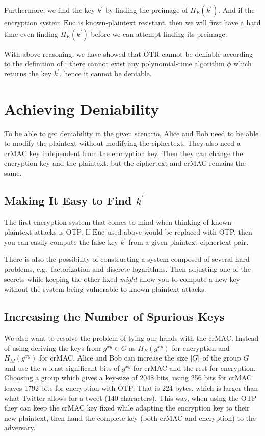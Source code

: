 Furthermore, we find the key \(k^\prime\) by finding the preimage of \(H_E( 
k^\prime )\).
And if the encryption system \(\operatorname{\mathrm{Enc}}\) is known-plaintext resistant, then we 
will first have a hard time even finding \(H_E( k^\prime )\) before we can 
attempt finding its preimage.

With above reasoning, we have showed that \ac{OTR} cannot be deniable according 
to the definition of \cite{deniablecrypt}: there cannot exist any 
polynomial-time algorithm \(\phi\) which returns the key \(k^\prime\), hence it 
cannot be deniable.


\section{Achieving Deniability}

To be able to get deniability in the given scenario, Alice and Bob need to be 
able to modify the plaintext without modifying the ciphertext.
They also need a \ac{crMAC} key independent from the encryption key.
Then they can change the encryption key and the plaintext, but the ciphertext 
and \ac{crMAC} remains the same.

\subsection{Making It Easy to Find \(k^\prime\)}

The first encryption system that comes to mind when thinking of known-plaintext 
attacks is \ac{OTP}.
If \(\operatorname{\mathrm{Enc}}\) used above would be replaced with \ac{OTP}, then you can easily 
compute the false key \(k^\prime\) from a given plaintext-ciphertext pair.

There is also the possibility of constructing a system composed of several hard 
problems, e.g.~factorization and discrete logarithms.
Then adjusting one of the secrets while keeping the other fixed \emph{might} 
allow you to compute a new key without the system being vulnerable to 
known-plaintext attacks.

\subsection{Increasing the Number of Spurious Keys}

We also want to resolve the problem of tying our hands with the \ac{crMAC}.
Instead of using deriving the keys from \(g^{xy}\in G\) as \(H_E(g^{xy})\) for 
encryption and \(H_M(g^{xy})\) for \ac{crMAC}, Alice and Bob can increase the 
size \(|G|\) of the group \(G\) and use the \(n\) least significant bits of 
\(g^{xy}\) for \ac{crMAC} and the rest for encryption.
Choosing a group which gives a key-size of 2048 bits, using 256 bits for 
\ac{crMAC} leaves 1792 bits for encryption with \ac{OTP}.
That is 224 bytes, which is larger than what Twitter allows for a tweet (140 
characters).
This way, when using the \ac{OTP} they can keep the \ac{crMAC} key fixed while 
adapting the encryption key to their new plaintext, then hand the complete key 
(both \ac{crMAC} and encryption) to the adversary.

